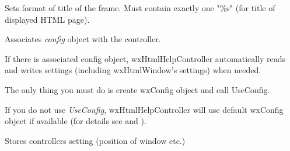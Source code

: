 \label{wxhtmlhelpcontrollersettitleformat}


Sets format of title of the frame. Must contain exactly one "\%s"
(for title of displayed HTML page).

\label{wxhtmlhelpcontrolleruseconfig}


Associates {\it config} object with the controller.

If there is associated config object, wxHtmlHelpController automatically
reads and writes settings (including wxHtmlWindow's settings) when needed.

The only thing you must do is create wxConfig object and call UseConfig.

If you do not use {\it UseConfig}, wxHtmlHelpController will use 
default wxConfig object if available (for details see 
 and 
).

\label{wxhtmlhelpcontrollerwritecustomization}


Stores controllers setting (position of window etc.)

